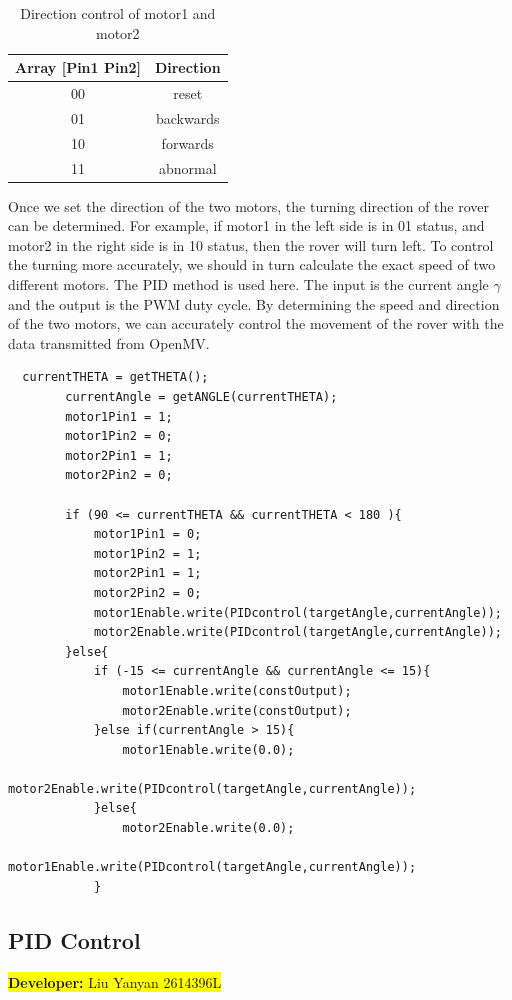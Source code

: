 \documentclass[12pt, a4paper, oneside]{report}
\begin{document}
\begin{table}[H]
    \centering
    \begin{tabular}{|c|c|}
    \hline
       Array [Pin1 Pin2]  & Direction  \\
    \hline
       00  & reset\\
       \hline
       01 & backwards\\
       \hline
       10 & forwards\\
       \hline
       11 & abnormal\\
       \hline   
    \end{tabular}
    \caption{Direction control of motor1 and motor2}
    \label{tab:my_label}
\end{table}

Once we set the direction of the two motors, the turning direction of the rover can be determined. For example, if motor1 in the left side is in 01 status, and motor2 in the right side is in 10 status, then the rover will turn left. To control the turning more accurately, we should in turn calculate the exact speed of two different motors. The PID method is used here. The input is the current angle $\gamma$ and the output is the PWM  duty cycle. By determining the speed and direction of the two motors, we can accurately control the movement of the rover with the data transmitted from OpenMV. 

\begin{lstlisting}
  currentTHETA = getTHETA();
        currentAngle = getANGLE(currentTHETA);
        motor1Pin1 = 1;
        motor1Pin2 = 0;
        motor2Pin1 = 1;
        motor2Pin2 = 0;
        
        if (90 <= currentTHETA && currentTHETA < 180 ){
            motor1Pin1 = 0;
            motor1Pin2 = 1;
            motor2Pin1 = 1;
            motor2Pin2 = 0;
            motor1Enable.write(PIDcontrol(targetAngle,currentAngle));
            motor2Enable.write(PIDcontrol(targetAngle,currentAngle));
        }else{
            if (-15 <= currentAngle && currentAngle <= 15){
                motor1Enable.write(constOutput);
                motor2Enable.write(constOutput);
            }else if(currentAngle > 15){
                motor1Enable.write(0.0);
                motor2Enable.write(PIDcontrol(targetAngle,currentAngle));
            }else{
                motor2Enable.write(0.0);
                motor1Enable.write(PIDcontrol(targetAngle,currentAngle));
            }
\end{lstlisting}
\subsection{PID Control}\label{sec:PID}
\colorbox{yellow}{\textbf{Developer:} Liu Yanyan 2614396L}
 
\end{document}
